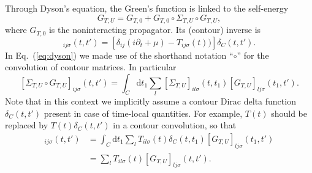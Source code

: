 \documentclass[twocolumn,prb,showpacs,aps,superscriptaddress]{revtex4}
\newcommand{\dt}[0]{\ensuremath{\mathrm{d}t}}
\begin{document}
Through Dyson's equation, the Green's function is linked to the self-energy
\begin{equation}
  \label{eq:dyson}
  G_{T,U} = G_{T,0} + G_{T,0} \circ \Sigma_{T,U} \circ G_{T,U},
\end{equation}
where $G_{T,0}$ is the noninteracting propagator. 
Its (contour) inverse is
\begin{equation}        
  [G_{T,0}^{-1}]_{ij\sigma}(t,t') 
               = \left[
                 \delta_{ij}(i\partial_t + \mu) - T_{ij\sigma}(t))
                 \right]\delta_C(t,t').
\end{equation}
In Eq.\ (\ref{eq:dyson}) we made use of the shorthand notation ``$\circ$'' for
the convolution of contour matrices.  In particular 
\begin{equation}
  \label{eq:convolution}
  [\Sigma_{T,U} \circ G_{T,U}]_{ij\sigma}(t,t')
  =
  \int_C \dt_1 
  \sum_{l}
  [\Sigma_{T,U}]_{il\sigma}(t, t_1)[G_{T,U}]_{lj\sigma}(t_1, t') .
\end{equation}
Note that in this context we implicitly assume a contour Dirac delta function
$\delta_C(t,t')$ present in case of time-local quantities.  For example, $T(t)$
should be replaced by $T(t)\delta_C(t,t')$ in a contour convolution, so that
\begin{align}
  [T \circ G_{T,U}]_{ij\sigma}(t,t')
  &=
  \int_C \dt_1 
  \sum_{l}
  T_{il\sigma}(t)\delta_C(t,t_1)[G_{T,U}]_{lj\sigma}(t_1, t')
  \nonumber\\
  &=
  \sum_{l}T_{il\sigma}(t)[G_{T,U}]_{lj\sigma}(t, t').
\end{align}
\end{document}
